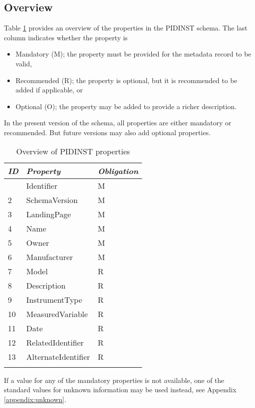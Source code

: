 \documentclass[titlepage=true,twoside=false,DIV=13]{scrartcl}
\begin{document}
\subsection{Overview}

Table \ref{schema:tab:propoverview} provides an overview of the
properties in the PIDINST schema.  The last column indicates whether
the property is
\begin{itemize}
\item Mandatory (M); the property must be provided for the metadata
  record to be valid,
\item Recommended (R); the property is optional, but it is recommended
  to be added if applicable, or
\item Optional (O); the property may be added to provide a richer
  description.
\end{itemize}
In the present version of the schema, all properties are either
mandatory or recommended.  But future versions may also add optional
properties.

\begin{longtable}{|l|l|l|}
  \hline
  \emph{ID} & \emph{Property} & \emph{Obligation} \\
  \hline \endhead
  \hline \endfoot\endlastfoot
  1     & Identifier          & M \\
  2     & SchemaVersion       & M \\
  3     & LandingPage         & M \\
  4     & Name                & M \\
  5     & Owner               & M \\
  6     & Manufacturer        & M \\
  7     & Model               & R \\
  8     & Description         & R \\
  9     & InstrumentType      & R \\
  10    & MeasuredVariable    & R \\
  11    & Date                & R \\
  12    & RelatedIdentifier   & R \\
  13    & AlternateIdentifier & R \\
  \hline
  \caption{Overview of PIDINST properties}
  \label{schema:tab:propoverview}
\end{longtable}

If a value for any of the mandatory properties is not available, one
of the standard values for unknown information may be used instead,
see Appendix \ref{appendix:unknown}.
\end{document}
